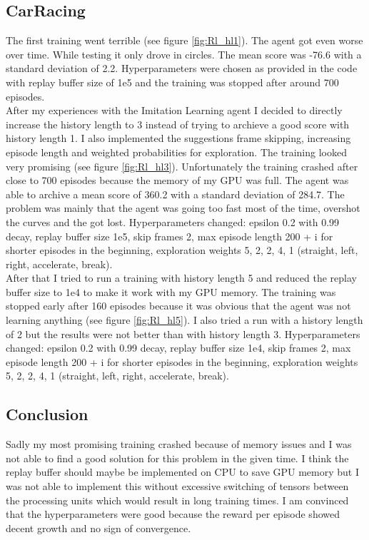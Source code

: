 \documentclass[10pt]{scrartcl}
\begin{document}
\subsection{CarRacing}
The first training went terrible (see figure \ref{fig:Rl_hl1}). The agent got even worse over time. While testing it only drove in circles. The mean score was -76.6 with a standard deviation of 2.2. Hyperparameters were chosen as provided in the code with replay buffer size of 1e5 and the training was stopped after around 700 episodes. \\
After my experiences with the Imitation Learning agent I decided to directly increase the history length to 3 instead of trying to archieve a good score with history length 1. I also implemented the suggestions frame skipping, increasing episode length and weighted probabilities for exploration. The training looked very promising (see figure \ref{fig:Rl_hl3}). Unfortunately the training crashed after close to 700 episodes because the memory of my GPU was full. The agent was able to archive a mean score of 360.2 with a standard deviation of 284.7. The problem was mainly that the agent was going too fast most of the time, overshot the curves and the got lost. Hyperparameters changed: epsilon 0.2 with 0.99 decay, replay buffer size 1e5, skip frames 2, max episode length 200 + i for shorter episodes in the beginning, exploration weights 5, 2, 2, 4, 1 (straight, left, right, accelerate, break). \\
After that I tried to run a training with history length 5 and reduced the replay buffer size to 1e4 to make it work with my GPU memory. The training was stopped early after 160 episodes because it was obvious that the agent was not learning anything (see figure \ref{fig:Rl_hl5}). I also tried a run with a history length of 2 but the results were not better than with history length 3. Hyperparameters changed: epsilon 0.2 with 0.99 decay, replay buffer size 1e4, skip frames 2, max episode length 200 + i for shorter episodes in the beginning, exploration weights 5, 2, 2, 4, 1 (straight, left, right, accelerate, break).

\subsection{Conclusion}
Sadly my most promising training crashed because of memory issues and I was not able to find a good solution for this problem in the given time. I think the replay buffer should maybe be implemented on CPU to save GPU memory but I was not able to implement this without excessive switching of tensors between the processing units which would result in long training times. I am convinced that the hyperparameters were good because the reward per episode showed decent growth and no sign of convergence.
\end{document}
